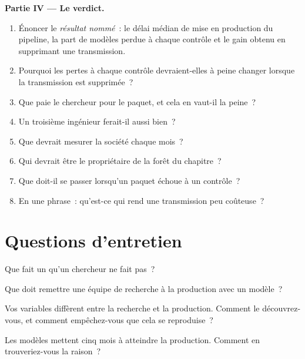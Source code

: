 \begin{problem}
\medskip\noindent\textbf{Partie IV --- Le verdict.}
\begin{enumerate}[resume]
\item Énoncer le \emph{résultat nommé}~: le délai médian de mise en production du pipeline, la part de modèles perdue à chaque contrôle et le gain obtenu en
supprimant une transmission.
\item Pourquoi les pertes à chaque contrôle devraient-elles à peine changer lorsque la transmission est supprimée~?
\item Que paie le chercheur pour le paquet, et cela en vaut-il la peine~?
\item Un troisième ingénieur ferait-il aussi bien~?
\item Que devrait mesurer la société chaque mois~?
\item Qui devrait être le propriétaire de la forêt du chapitre~?
\item Que doit-il se passer lorsqu'un paquet échoue à un contrôle~?
\item En une phrase~: qu'est-ce qui rend une transmission peu coûteuse~?
\end{enumerate}
\end{problem}

\section{Questions d'entretien}

\begin{interviewq}\label{iq:ml:the-machine-learning-team:1}
Que fait un  qu'un chercheur ne fait pas~?
\end{interviewq}

\begin{interviewq}\label{iq:ml:the-machine-learning-team:2}
Que doit remettre une équipe de recherche à la production avec un modèle~?
\end{interviewq}

\begin{interviewq}\label{iq:ml:the-machine-learning-team:3}
Vos variables diffèrent entre la recherche et la production. Comment le découvrez-vous, et comment empêchez-vous que cela se reproduise~?
\end{interviewq}

\begin{interviewq}\label{iq:ml:the-machine-learning-team:4}
Les modèles mettent cinq mois à atteindre la production. Comment en trouveriez-vous la raison~?
\end{interviewq}

